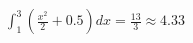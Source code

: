 \documentclass[preview]{standalone}
\begin{document}
\begin{align*}
\int_1^3 \left(\frac{x^2}{2} + 0.5\right) dx = \frac{13}{3} \approx 4.33
\end{align*}
\end{document}
